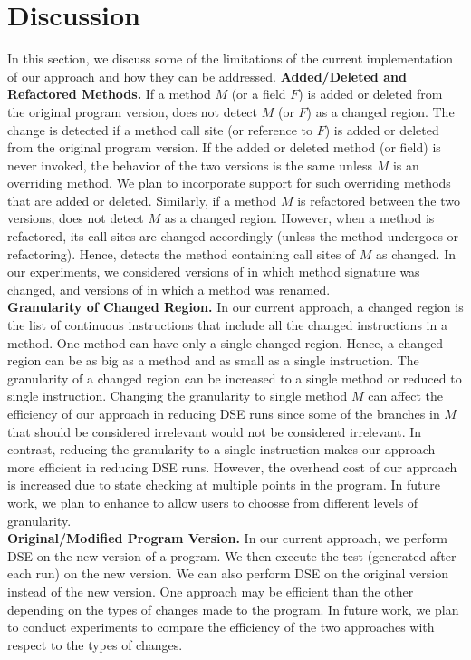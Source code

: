 
\section{Discussion}

\label{sec:discussion}
In this section, we discuss some of the limitations of the current implementation of our approach and
how they can be addressed.
\textbf{Added/Deleted and Refactored Methods.} If a method $M$ (or a field $F$) is added or deleted from the original program version,  does not detect $M$ (or $F$) as a changed region. The change is detected if a method call site (or reference to $F$) is added or deleted from the original program version. If the added or deleted method (or field) is never invoked, the behavior of the two versions is the same unless $M$  is an overriding method. We plan to incorporate support for such overriding methods that are added or deleted. Similarly, if a method $M$ is refactored between the two versions,  does not detect $M$ as a changed region. However, when a method is refactored, its call sites are changed accordingly (unless the method undergoes  or  refactoring). Hence,  detects the method containing call sites of $M$ as changed. In our experiments, we considered versions of  in which method signature was changed, and versions of  in which a method was renamed.
\\ \textbf{Granularity of Changed Region.} In our current approach, a changed region is the list of continuous instructions that include all the changed instructions in a method. One method can have only a single changed region. Hence, a changed region can be as big as a method and as small as a single instruction. The granularity of a changed region can be increased to a single method or reduced to single instruction. Changing the granularity to single method $M$ can affect the efficiency of our approach in reducing DSE runs since some of the branches in $M$ that should be considered irrelevant would not be considered irrelevant. In contrast, reducing the granularity to a single instruction makes our approach more efficient in reducing DSE runs. However, the overhead cost of our approach is increased due to state checking at multiple points in the program. In future work, we plan to enhance  to allow users to choosse from different levels of granularity. 
\\ \textbf{Original/Modified Program Version.} In our current approach, we perform DSE on the new version of a program. We then execute the test (generated after each run) on the new version. We can also perform DSE on the original version instead of the new version. One approach may be efficient than the other depending on the types of changes made to the program. In future work, we plan to conduct experiments to compare the efficiency of the two approaches with respect to the types of changes. 
